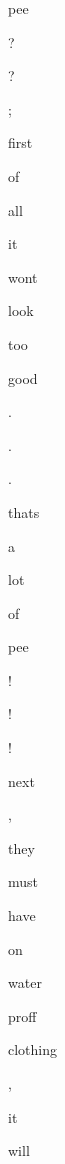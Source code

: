 \documentclass[varwidth]{standalone}
\begin{document}
\begin{CJK*}{UTF8}{gbsn}
{{{\colorbox{red!12.221786}{\strut pee} \colorbox{red!0.54333794}{\strut ?} \colorbox{red!0.7223919}{\strut ?} \colorbox{red!1.1482066}{\strut ;} \colorbox{red!0.32861504}{\strut first} \colorbox{red!0.43650642}{\strut of} \colorbox{red!0.69243807}{\strut all} \colorbox{red!0.121158235}{\strut it} \colorbox{red!5.5267286}{\strut wont} \colorbox{red!1.7961512}{\strut look} \colorbox{red!0.56394243}{\strut too} \colorbox{red!3.8616874}{\strut good} \colorbox{red!0.95044273}{\strut .} \colorbox{red!0.5836174}{\strut .} \colorbox{red!1.2301043}{\strut .} \colorbox{red!3.3472474}{\strut thats} \colorbox{red!0.70275766}{\strut a} \colorbox{red!2.162697}{\strut lot} \colorbox{red!1.1891309}{\strut of} \colorbox{red!11.924183}{\strut pee} \colorbox{red!1.1971079}{\strut !} \colorbox{red!1.3304622}{\strut !} \colorbox{red!1.3006142}{\strut !} \colorbox{blue!0.0613938}{\strut next} \colorbox{red!0.62890023}{\strut ,} \colorbox{red!3.3922434}{\strut they} \colorbox{blue!0.533835}{\strut must} \colorbox{red!1.2889097}{\strut have} \colorbox{red!0.9224657}{\strut on} \colorbox{red!6.252714}{\strut water} \colorbox{red!5.5915008}{\strut proff} \colorbox{red!1.425863}{\strut clothing} \colorbox{red!1.6240183}{\strut ,} \colorbox{blue!0.32671723}{\strut it} \colorbox{red!2.160842}{\strut will} 
}}}
\end{CJK*}
\end{document}
